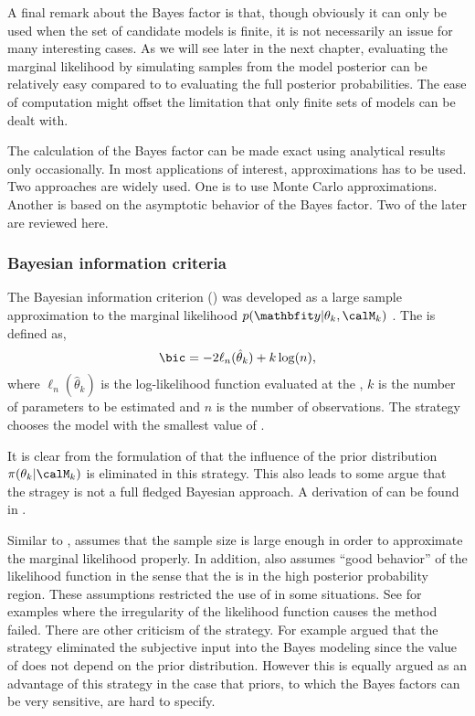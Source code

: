 

A final remark about the Bayes factor is that, though obviously it can only
be used when the set of candidate models is finite, it is not necessarily an
issue for many interesting cases. As we will see later in the next chapter,
evaluating the marginal likelihood by simulating samples from the model
posterior can be relatively easy compared to to evaluating the full posterior
probabilities. The ease of computation might offset the limitation that only
finite sets of models can be dealt with.

The calculation of the Bayes factor can be made exact using analytical results
only occasionally. In most applications of interest, approximations has to be
used. Two approaches are widely used. One is to use Monte Carlo
approximations. Another is based on the asymptotic behavior of the Bayes
factor. Two of the later are reviewed here.

\subsubsection{Bayesian information criteria}
\label{ssub:Bayesian information criteria}

The Bayesian information criterion (\bic) was developed as a large sample
approximation to the marginal likelihood $p(\data|\theta_k,\calM_k)$
\cite{Schwarz:1978uv}. The \bic is defined as,
\begin{equation}
  \text{\bic} = -2\ell_n(\hat\theta_k) + k\log(n),
  \label{eq:bic}
\end{equation}
where $\ell_n(\hat\theta_k)$ is the log-likelihood function evaluated at the
\mle, $k$ is the number of parameters to be estimated and $n$ is the number
of observations. The \bic strategy chooses the model with the smallest value
of \bic.

It is clear from the formulation of \bic that the influence of the prior
distribution $\pi(\theta_k|\calM_k)$ is eliminated in this strategy. This
also leads to some argue that the \bic stragey is not a full fledged Bayesian
approach. A derivation of \bic can be found in
\cite[][sec.~3.2]{Claeskens:2008tq}.

Similar to \aic, \bic assumes that the sample size is large enough in order
to approximate the marginal likelihood properly. In addition, \bic also
assumes ``good behavior'' of the likelihood function in the sense that the
\mle is in the high posterior probability region. These assumptions
restricted the use of \bic in some situations. See \cite{Berger:2001uy}
for examples where the irregularity of the likelihood function causes the
\bic method failed. There are other criticism of the \bic strategy. For
example \cite[][sec.~7.2.3]{Robert:2007tc} argued that the \bic strategy
eliminated the subjective input into the Bayes modeling since the value of
\bic does not depend on the prior distribution. However this is equally
argued as an advantage of this strategy in the case that priors, to which the
Bayes factors can be very sensitive, are hard to specify.

